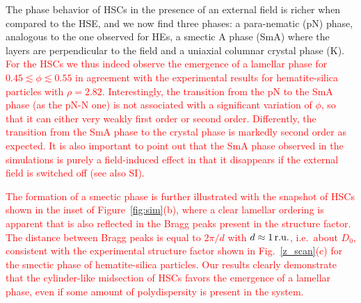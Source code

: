 \documentclass[aps,prl,preprint,superscriptaddress]{revtex4-1} %
\begin{document}
The phase behavior of HSCs in the presence of an external field is richer when compared to the HSE, and we now find three phases: a para-nematic (pN) 
phase, analogous to the one observed for HEs, a smectic A phase (SmA) where the layers 
are perpendicular to the field and a uniaxial columnar crystal phase (K).
\textcolor{red}{For the HSCs we thus indeed observe the emergence of a lamellar phase for $0.45\lesssim\phi\lesssim 0.55$ 
in agreement with the experimental results for hematite-silica particles with $\rho=2.82$.
Interestingly, the transition from the pN to the SmA phase (as the pN-N one) 
is not associated with a significant variation of $\phi$, so that it can either
very weakly first order or second order. Differently, the transition from the SmA phase to the crystal phase
is markedly second order as expected. It is also important to point out that the SmA phase observed in the simulations is purely a field-induced effect in that
it disappears if the external field is switched off (see also SI). }

\textcolor{red}{The formation of a smectic phase is further illustrated with the snapshot of HSCs shown in the inset of Figure~\ref{fig:sim}(b), where a clear lamellar ordering is apparent that is also reflected in the Bragg peaks present in the structure factor.
The distance between Bragg peaks is equal to $2\pi/d$ with $d\approx 1\,\hbox{r.u.}$, i.e.~about $D_0$, consistent with the experimental structure
factor shown in Fig.~\ref{z_scan}(c) for the smectic phase of hematite-silica particles.
Our results clearly demonstrate that the cylinder-like midsection of HSCs favors the emergence of a lamellar phase,
even if some amount of polydispersity is present in the system. }

\end{document}
